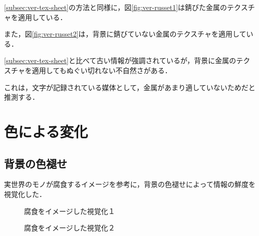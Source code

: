 \ref{subsec:ver-tex-sheet}の方法と同様に，図\ref{fig:ver-russet1}は錆びた金属のテクスチャを適用している．

また，図\ref{fig:ver-russet2}は，背景に錆びていない金属のテクスチャを適用している．

\ref{subsec:ver-tex-sheet}と比べて古い情報が強調されているが，背景に金属のテクスチャを適用してもぬぐい切れない不自然さがある．

これは，文字が記録されている媒体として，金属があまり適していないためだと推測する．

\section{色による変化}
\label{sec:ver-color}

\subsection{背景の色褪せ}
\label{subsec:ver-col-cor}

実世界のモノが腐食するイメージを参考に，背景の色褪せによって情報の鮮度を視覚化した．

\begin{figure}[htbp]
  \begin{minipage}{0.5\hsize}
    \begin{center}
    \end{center}
    \caption{腐食をイメージした視覚化１}
    \label{fig:ver-corrosion1}
  \end{minipage}
  \begin{minipage}{0.5\hsize}
    \begin{center}
    \end{center}
    \caption{腐食をイメージした視覚化２}
    \label{fig:ver-corrosion2}
  \end{minipage}
\end{figure}

